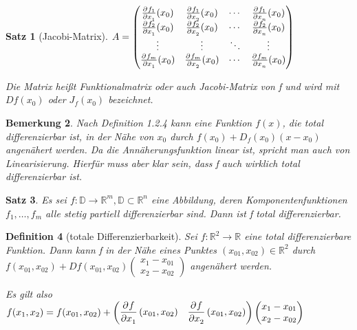 \documentclass[fontset=ubuntu,11pt,a4paper,fleqn,headsepline]{scrreprt}
\newtheorem{defi}{Definition}[section]
\newtheorem{bemerkung}[defi]{Bemerkung}
\newtheorem{satz}[defi]{Satz}
\begin{document}
\begin{multicols}{2}
\begin{satz}[Jacobi-Matrix]
        \(A=\begin{pmatrix}
        \pd{f_1}{x_1}(x_0) & \pd{f_1}{x_2}(x_0) & \cdots & \pd{f_1}{x_n}(x_0) \\
        \pd{f_2}{x_1}(x_0) & \pd{f_2}{x_2}(x_0) & \cdots & \pd{f_2}{x_n}(x_0) \\
        \vdots & \vdots & \ddots & \vdots \\
        \pd{f_m}{x_1}(x_0) & \pd{f_m}{x_2}(x_0) & \cdots & \pd{f_m}{x_n}(x_0)
        \end{pmatrix}\)
        
        Die Matrix heißt Funktionalmatrix oder auch Jacobi-Matrix von f und wird mit \(Df(x_0)\) oder \(J_f(x_0)\) bezeichnet.
    \end{satz}
    
    \begin{bemerkung}
        Nach Definition 1.2.4 kann eine Funktion \(f(x)\), die total differenzierbar ist, in der Nähe von \(x_0\) durch \(f(x_0)+D_f(x_0)(x-x_0)\) angenähert werden. Da die Annäherungsfunktion linear ist, spricht man auch von Linearisierung. Hierfür muss aber klar sein, dass f auch wirklich total differenzierbar ist.
    \end{bemerkung}
    
    \begin{satz}
        Es sei \(f:\mathbb{D}\to \mathbb{R}^m,\mathbb{D}\subset\mathbb{R}^n\) eine Abbildung, deren Komponentenfunktionen \(f_1,\dots,f_m\) alle stetig partiell differenzierbar sind. Dann ist f total differenzierbar.
    \end{satz}
    
    \begin{defi}[totale Differenzierbarkeit]
    Sei \(f:\mathbb{R}^2\to\mathbb{R}\) eine total differenzierbare Funktion. Dann kann f in der Nähe eines Punktes \((x_{01},x_{02})\in\mathbb{R}^2\) durch \(f(x_{01},x_{02})+Df(x_{01},x_{02})\begin{pmatrix}x_1-x_{01} \\ x_2-x_{02}\end{pmatrix}\) angenähert werden.
    
        Es gilt also \(f(x_1,x_2)=f(x_{01},x_{02})+\begin{pmatrix}
            \dpd{f}{x_1}(x_{01},x_{02}) & \dpd{f}{x_2}(x_{01},x_{02})\end{pmatrix}\begin{pmatrix}
                x_1-x_{01} \\ x_2-x_{02}
            \end{pmatrix}\)
    

\end{defi}
\end{multicols}
\end{document}
